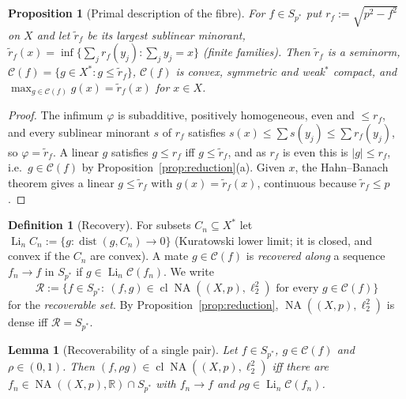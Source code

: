 \documentclass[10pt]{amsart}
\newtheorem{lemma}[theorem]{Lemma}
\newtheorem{proposition}[theorem]{Proposition}
\theoremstyle{definition}
\newtheorem{definition}[theorem]{Definition}
\theoremstyle{remark}
\newcommand{\NA}{\operatorname{NA}}
\newcommand{\dist}{\operatorname{dist}}
\newcommand{\R}{\mathbb R}
\newcommand{\Cset}{\mathcal C}
\newcommand{\Li}{\operatorname*{Li}}
\newcommand{\cl}{\operatorname{cl}}
\newcommand{\Rec}{\mathcal R}
\begin{document}
\begin{proposition}[Primal description of the fibre]\label{prop:primal}
For $f\in S_{p^*}$ put $r_f:=\sqrt{p^2-f^2}$ on $X$ and let $\tilde r_f$ be
its largest sublinear minorant,
$\tilde r_f(x)=\inf\{\sum_jr_f(y_j):\sum_jy_j=x\}$ \textup{(}finite
families\textup{)}.  Then $\tilde r_f$ is a seminorm,
$\Cset(f)=\{g\in X^*:g\le\tilde r_f\}$, $\Cset(f)$ is convex, symmetric
and weak$^*$ compact, and $\max_{g\in\Cset(f)}g(x)=\tilde r_f(x)$ for
$x\in X$.
\end{proposition}

\begin{proof}
The infimum $\varphi$ is subadditive, positively homogeneous, even and
$\le r_f$, and every sublinear minorant $s$ of $r_f$ satisfies
$s(x)\le\sum s(y_j)\le\sum r_f(y_j)$, so $\varphi=\tilde r_f$.  A linear $g$
satisfies $g\le r_f$ iff $g\le\tilde r_f$, and as $r_f$ is even this is
$|g|\le r_f$, i.e.\ $g\in\Cset(f)$ by Proposition~\ref{prop:reduction}(a).
Given $x$, the Hahn--Banach theorem gives a linear $g\le\tilde r_f$ with
$g(x)=\tilde r_f(x)$, continuous because $\tilde r_f\le p$.
\end{proof}

\begin{definition}[Recovery]\label{def:recovery}
For subsets $C_n\subseteq X^*$ let
$\Li_nC_n:=\{g:\dist(g,C_n)\to0\}$ (Kuratowski lower limit; it is closed,
and convex if the $C_n$ are convex).  A mate $g\in\Cset(f)$ is
\emph{recovered along} a sequence $f_n\to f$ in $S_{p^*}$ if
$g\in\Li_n\Cset(f_n)$.  We write
\[
 \Rec:=\{f\in S_{p^*}:\ (f,g)\in\cl\NA((X,p),\ell_2^2)\text{ for every }
 g\in\Cset(f)\}
\]
for the \emph{recoverable set}.  By Proposition~\ref{prop:reduction},
$\NA((X,p),\ell_2^2)$ is dense iff $\Rec=S_{p^*}$.
\end{definition}

\begin{lemma}[Recoverability of a single pair]\label{lem:pair}
Let $f\in S_{p^*}$, $g\in\Cset(f)$ and $\rho\in(0,1)$.  Then
$(f,\rho g)\in\cl\NA((X,p),\ell_2^2)$ iff there are
$f_n\in\NA((X,p),\R)\cap S_{p^*}$ with $f_n\to f$ and
$\rho g\in\Li_n\Cset(f_n)$.
\end{lemma}
\end{document}
